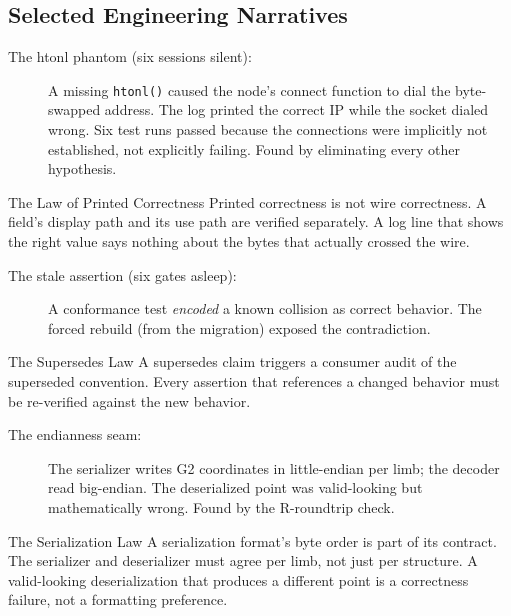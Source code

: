 \documentclass[11pt, a4paper]{article}
\theoremstyle{plain}
\theoremstyle{definition}
\theoremstyle{remark}
\begin{document}
\subsection{Selected Engineering Narratives}

\begin{description}
\item[The htonl phantom (six sessions silent):] A missing
\texttt{htonl()} caused the node's connect function to dial the
byte-swapped address. The log printed the correct IP while the socket
dialed wrong. Six test runs passed because the connections were
implicitly not established, not explicitly failing. Found by
eliminating every other hypothesis.
\end{description}

\begin{infobox}{The Law of Printed Correctness}
Printed correctness is not wire correctness. A field's display path
and its use path are verified separately. A log line that shows the
right value says nothing about the bytes that actually crossed the
wire.
\end{infobox}

\begin{description}
\item[The stale assertion (six gates asleep):] A conformance test
\emph{encoded} a known collision as correct behavior. The forced
rebuild (from the migration) exposed the contradiction.
\end{description}

\begin{infobox}{The Supersedes Law}
A supersedes claim triggers a consumer audit of the superseded
convention. Every assertion that references a changed behavior must
be re-verified against the new behavior.
\end{infobox}

\begin{description}
\item[The endianness seam:] The serializer writes G2 coordinates in
little-endian per limb; the decoder read big-endian. The deserialized
point was valid-looking but mathematically wrong. Found by the
R-roundtrip check.
\end{description}

\begin{infobox}{The Serialization Law}
A serialization format's byte order is part of its contract. The
serializer and deserializer must agree per limb, not just per
structure. A valid-looking deserialization that produces a different
point is a correctness failure, not a formatting preference.
\end{infobox}
\end{document}
